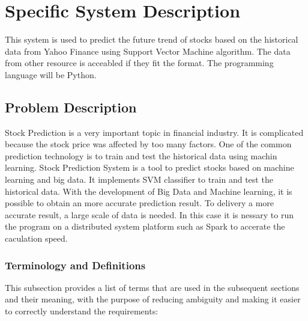 \documentclass[12pt]{article}
\newcommand{\progname}{Stock Prediction System} %
\begin{document}
\section{Specific System Description}

This system is used to predict the future trend of stocks based on the historical data from Yahoo Finance using Support Vector Machine algorithm. The data from other resource is acceabled if they fit the format. The programming language will be Python.

\subsection{Problem Description} \label{Sec_pd}

Stock Prediction is a very important topic in financial industry. It is  complicated because the stock price was affected by too many factors. One of the common prediction technology is to train and test the historical data using machin learning.
\progname{} is a tool to predict stocks based on machine learning and big data. It implements SVM classifier to train and test the historical data.  With the development of Big Data and Machine learning, it is possible to obtain an more accurate prediction result. 
To delivery a more accurate result, a large scale of data is needed. In this case it is nessary to run the program on a distributed system platform such as Spark to accerate the caculation speed.


\subsubsection{Terminology and  Definitions}

This subsection provides a list of terms that are used in the subsequent
sections and their meaning, with the purpose of reducing ambiguity and making it
easier to correctly understand the requirements:
\end{document}
